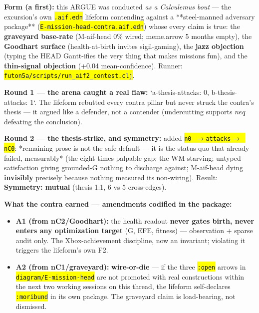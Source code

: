 \documentclass[11pt,oneside]{article}
\newcommand{\scopehl}[1]{\texttt{\hl{#1}}}
\begin{document}
\begin{phasebox}[title={4. ARGUE (2026-06-10) --- the lifeform's self-argument: why should I exist?}]

\textbf{Form (a first):} this ARGUE was conducted \emph{as a Calculemus bout} --- the
excursion's own \scopehl{.aif.edn} lifeform contending against a **steel-manned
adversary package** (\scopehl{E-mission-head-contra.aif.edn}) whose every claim is
true: the \textbf{graveyard base-rate} (M-aif-head 0\% wired; meme.arrow 5 months
empty), the \textbf{Goodhart surface} (health-at-birth invites sigil-gaming), the
\textbf{jazz objection} (typing the HEAD Gantt-ifies the very thing that makes
missions fun), and the \textbf{thin-signal objection} (+0.04 mean-confidence).
Runner: \scopehl{futon5a/scripts/run\_aif2\_contest.clj}.

\textbf{Round 1 --- the arena caught a real flaw:} `a-thesis-attacks: 0,
b-thesis-attacks: 1`. The lifeform rebutted every contra pillar but never
struck the contra's thesis --- it argued like a defender, not a contender
(undercutting supports $\\neq$ defeating the conclusion).

\textbf{Round 2 --- the thesis-strike, and symmetry:} added \scopehl{n0 $\rightarrow$attacks$\rightarrow$ nC0}:
*remaining prose is not the safe default --- it is the status quo that already
failed, measurably* (the eight-times-palpable gap; the WM starving; untyped
satisfaction giving grounded-G nothing to discharge against; M-aif-head dying
\textbf{invisibly} precisely because nothing measured its non-wiring). Result:
\textbf{Symmetry: mutual} (thesis 1:1, 6 vs 5 cross-edges).

\textbf{What the contra earned --- amendments codified in the package:}
\begin{itemize}[leftmargin=1.2em,itemsep=1pt]
\item \textbf{A1 (from nC2/Goodhart):} the health readout \textbf{never gates birth, never enters any optimization target} (G, EFE, fitness) --- observation + sparse audit only. The Xbox-achievement discipline, now an invariant; violating it triggers the lifeform's own F2.
\item \textbf{A2 (from nC1/graveyard):} \textbf{wire-or-die} --- if the three \scopehl{:open} arrows in \scopehl{diagram/E-mission-head} are not promoted with real constructions within the next two working sessions on this thread, the lifeform self-declares \scopehl{:moribund} in its own package. The graveyard claim is load-bearing, not dismissed.
\end{itemize}


\end{phasebox}
\end{document}
